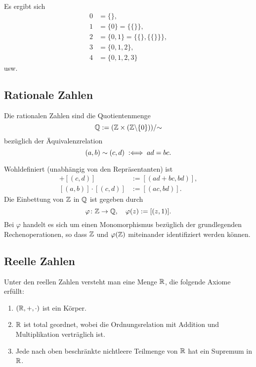 Es ergibt sich
\begin{align*}
0 &= \{\},\\
1 &= \{0\} = \{\{\}\},\\
2 &= \{0,1\} = \{\{\},\{\{\}\}\},\\
3 &= \{0,1,2\},\\
4 &= \{0,1,2,3\}
\end{align*}
usw.

\newpage
\subsection{Rationale Zahlen}
\begin{definition}\mbox{}\newline
Die rationalen Zahlen sind die Quotientenmenge
\begin{equation}
\mathbb Q := (\mathbb Z\times(\mathbb Z{\setminus}\{0\}))/{\sim}
\end{equation}
bezüglich der Äquivalenzrelation
\begin{equation}
(a,b)\sim (c,d) \;:\Longleftrightarrow\; ad=bc.
\end{equation}
\end{definition}
Wohldefiniert (unabhängig von den Repräsentanten) ist
\begin{align}
[(a,b)]+[(c,d)] &:= [(ad+bc, bd)],\\
[(a,b)]\cdot [(c,d)] &:= [(ac,bd)].
\end{align}
Die Einbettung von $\mathbb Z$ in $\mathbb Q$ ist gegeben durch
\begin{equation}
\varphi\colon \mathbb Z\to\mathbb Q,\quad \varphi(z):=[(z,1)].
\end{equation}
Bei $\varphi$ handelt es sich um einen Monomorphismus
bezüglich der grundlegenden Rechenoperationen, so
dass $\mathbb Z$ und $\varphi(\mathbb Z)$ miteinander
identifiziert werden können.

\subsection{Reelle Zahlen}
\begin{definition}\mbox{}\newline
Unter den reellen Zahlen versteht man eine Menge $\mathbb R$, die folgende
Axiome erfüllt:
\begin{enumerate}[itemsep=0pt]
\item $(\mathbb R,+,\cdot)$ ist ein Körper.
\item $\mathbb R$ ist total geordnet, wobei die Ordnungsrelation mit
Addition und Multiplikation verträglich ist.
\item Jede nach oben beschränkte nichtleere Teilmenge von $\mathbb R$ hat
  ein Supremum in $\mathbb R$.
\end{enumerate}
\end{definition}

